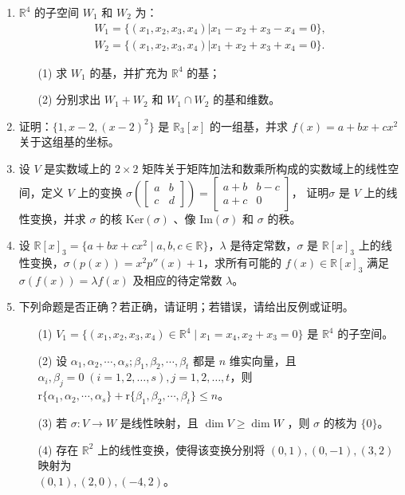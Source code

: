 \begin{enumerate}
    \item \(\mathbb{R}^4\) 的子空间 \(W_1\) 和 \(W_2\) 为：
    \begin{align*}
        W_1 = \{ (x_1,x_2,x_3,x_4) | x_1 - x_2 + x_3 - x_4 = 0 \}, \\
        W_2 = \{ (x_1,x_2,x_3,x_4) | x_1 + x_2 + x_3 + x_4 = 0 \}.
    \end{align*}
    \begin{enumerate}
        \item[(1)] 求 \(W_1\) 的基，并扩充为 \(\mathbb{R}^4\) 的基；
        \item[(2)] 分别求出 \(W_1+W_2\) 和 \(W_1\cap W_2\) 的基和维数。
    \end{enumerate}

    \item 证明：\(\{1,x-2,(x-2)^2\}\) 是 \(\mathbb{R}_3[x]\) 的一组基，并求 \(f(x)=a+bx+cx^2\) 关于这组基的坐标。

    \item 设 \(V\) 是实数域上的 \(2\times2\) 矩阵关于矩阵加法和数乘所构成的实数域上的线性空间，定义 \(V\) 上的变换
    \(\sigma\left(\left[\begin{matrix}
        a & b \\
        c & d
    \end{matrix}\right]\right)= \left[\begin{matrix}
        a + b & b - c \\
        a + c & 0
    \end{matrix}\right]
    \)，
    证明\(\sigma\) 是 \(V\) 上的线性变换，并求 \(\sigma\) 的核 \(\text{Ker}(\sigma)\) 、像 \(\text{Im}(\sigma)\) 和 \(\sigma\) 的秩。

    \item 设 $\mathbb{R}[x]_3 = \{a + bx + cx^2 \mid a, b, c \in \mathbb{R}\}$，$\lambda$ 是待定常数，$\sigma$ 是 $\mathbb{R}[x]_3$ 上的线性变换，$\sigma(p(x)) = x^2 p''(x) + 1$，求所有可能的 $f(x) \in \mathbb{R}[x]_3$ 满足 $\sigma(f(x)) = \lambda f(x)$ 及相应的待定常数 $\lambda$。

    \item 下列命题是否正确？若正确，请证明；若错误，请给出反例或证明。
    \begin{enumerate}
        \item[(1)] \(V_1 = \{(x_1,x_2,x_3,x_4)\in \mathbb{R}^4 \mid x_1 = x_4, x_2 + x_3 = 0\}\) 是 \(\mathbb{R}^4\) 的子空间。
        \item[(2)] 设 \(\alpha_1,\alpha_2,\cdots,\alpha_s;\beta_1,\beta_2,\cdots,\beta_t\) 都是 \(n\) 维实向量，且 \(\alpha_i,\beta_j=0\;(i=1,2,\dots,s),j=1,2,\dots,t\)，则 \(\text{r}\{\alpha_1,\alpha_2,\cdots,\alpha_s\}+\text{r}\{\beta_1,\beta_2,\cdots,\beta_t\} \leq n\)。
        \item[(3)] 若 \(\sigma:V\rightarrow W\) 是线性映射，且 \(\dim V \ge \dim W\) ，则 \(\sigma\) 的核为 \(\{0\}\)。
        \item[(4)] 存在 \(\mathbb{R}^2\) 上的线性变换，使得该变换分别将 \((0,1),(0,-1),(3,2)\) 映射为 \\
        \((0,1),(2,0),(-4,2)\)。
    \end{enumerate}
\end{enumerate}

\clearpage

